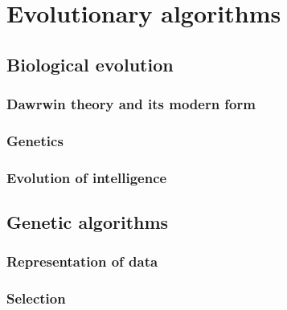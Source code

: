 \chapter{Evolutionary algorithms}


\section{Biological evolution}

\subsection{Dawrwin theory and its modern form}

\subsection{Genetics}

\subsection{Evolution of intelligence}

\section{Genetic algorithms}

\subsection{Representation of data}

\subsection{Selection}

